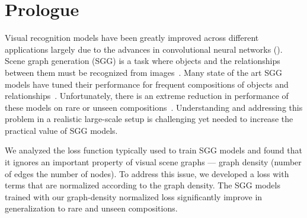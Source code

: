\section*{Prologue}


\vspace{10pt}
Visual recognition models have been greatly improved across different applications largely due to the advances in convolutional neural networks (\cnns). Scene graph generation (SGG) is a task where objects and the relationships between them must be recognized from images~\citep{xu2017scene}. Many state of the art SGG models have tuned their performance for frequent compositions of objects and relationships~\citep{zellers2018neural}. Unfortunately, there is an extreme reduction in performance of these models on rare or unseen compositions~\citep{tang2020unbiased}. Understanding and addressing this problem in a realistic large-scale setup is challenging yet needed to increase the  practical value of SGG models.

We analyzed the loss function typically used to train SGG models and found that it ignores an important property of visual scene graphs --- graph density (number of edges \wrt the number of nodes). To address this issue, we developed a loss with terms that are normalized according to the graph density. The SGG models trained with our graph-density normalized loss significantly improve in generalization to rare and unseen compositions.

